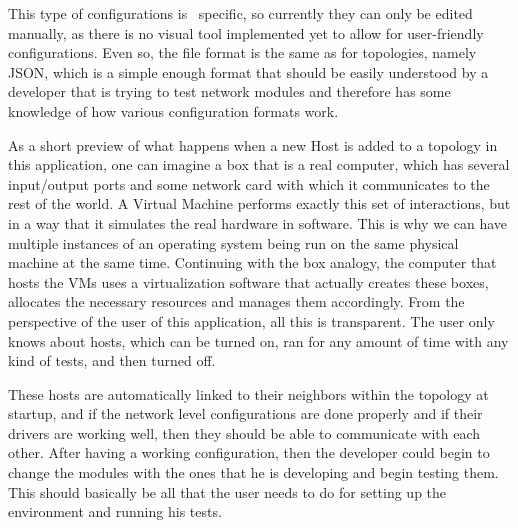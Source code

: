 This type of configurations is \project\ specific, so currently they can only be edited manually, as there is no visual tool implemented yet to allow for user-friendly configurations.
Even so, the file format is the same as for topologies, namely JSON, which is a simple enough format that should be easily understood by a developer that is trying to test network modules and therefore has some knowledge of how various configuration formats work.

As a short preview of what happens when a new Host is added to a topology in this application, one can imagine a box that is a real computer, which has several input/output ports and some network card with which it communicates to the rest of the world.
A Virtual Machine performs exactly this set of interactions, but in a way that it simulates the real hardware in software.
This is why we can have multiple instances of an operating system being run on the same physical machine at the same time.
Continuing with the box analogy, the computer that hosts the VMs uses a virtualization software that actually creates these boxes, allocates the necessary resources and manages them accordingly.
From the perspective of the user of this application, all this is transparent.
The user only knows about hosts, which can be turned on, ran for any amount of time with any kind of tests, and then turned off.

These hosts are automatically linked to their neighbors within the topology at startup, and if the network level configurations are done properly and if their drivers are working well, then they should be able to communicate with each other.
After having a working configuration, then the developer could begin to change the modules with the ones that he is developing and begin testing them.
This should basically be all that the user needs to do for setting up the environment and running his tests.

